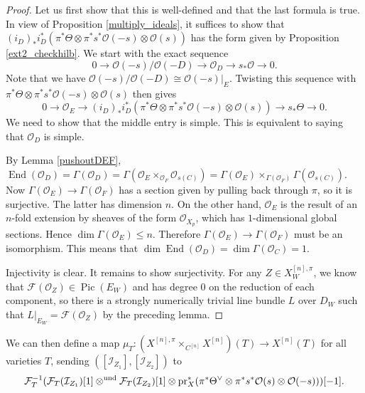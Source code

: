 \documentclass{amsart}
\theoremstyle{plain}
\theoremstyle{definition}
\theoremstyle{remark}
\begin{document}
    \begin{proof}
        Let us first show that this is well-defined and that the last formula is true.
        In view of Proposition \ref{multiply_ideals}, it suffices to show that $(i_D)_\ast i_D^\ast(\pi^\ast\Theta\otimes \pi^\ast s^{\ast}\mathcal O(-s)\otimes\mathcal O(s))$ has the form given by Proposition \ref{ext2_checkhilb}.
        We start with the exact sequence
        \[
        0\to \mathcal O(-s)/\mathcal O(-D)\to \mathcal O_D\to s_\ast\mathcal O\to 0.
        \]
        Note that we have $\mathcal O(-s)/\mathcal O(-D)\cong\mathcal O(-s)|_E$.
        Twisting this sequence with $\pi^\ast\Theta\otimes \pi^\ast s^{\ast}\mathcal O(-s)\otimes\mathcal O(s)$ then gives
        \[
        0\to \mathcal O_E\to (i_D)_\ast i_D^\ast(\pi^\ast\Theta\otimes \pi^\ast s^{\ast}\mathcal O(-s)\otimes\mathcal O(s)) \to s_\ast\Theta\to 0.
        \]
        We need to show that the middle entry is simple.
        This is equivalent to saying that $\mathcal O_D$ is simple.
        
        By Lemma \ref{pushoutDEF}, $\operatorname{End}(\mathcal O_D)=\Gamma(\mathcal O_D)=\Gamma(\mathcal O_E\times_{\mathcal O_F}\mathcal O_{s(C)})=\Gamma(\mathcal O_E)\times_{\Gamma(\mathcal O_F)}\Gamma(\mathcal O_{s(C)})$.
        Now $\Gamma(\mathcal O_E)\to\Gamma(\mathcal O_F)$ has a section given by pulling back through $\pi$, so it is surjective.
        The latter has dimension $n$.
        On the other hand, $\mathcal O_E$ is the result of an $n$-fold extension by sheaves of the form $\mathcal O_{X_p}$, which has $1$-dimensional global sections.
        Hence $\dim\Gamma(\mathcal O_E)\le n$.
        Therefore $\Gamma(\mathcal O_E)\to\Gamma(\mathcal O_F)$ must be an isomorphism.
        This means that $\dim\operatorname{End}(\mathcal O_D)=\dim\Gamma(\mathcal O_C)=1$.

        Injectivity is clear.
        It remains to show surjectivity.
        For any $Z\in X_W^{[n],\pi}$, we know that $\mathcal F(\mathcal O_Z)\in\operatorname{Pic}(E_W)$ and has degree $0$ on the reduction of each component, so there is a strongly numerically trivial line bundle $L$ over $D_W$ such that $L|_{E_W}=\mathcal F(\mathcal O_Z)$ by the preceding lemma.
    \end{proof}
    We can then define a map $\mu_T:(X^{[n],\pi}\times_{C^{[n]}}X^{[n]})(T)\to X^{[n]}(T)$ for all varieties $T$, sending $([\mathcal I_{Z_1}],[\mathcal I_{Z_2}])$ to
    \[\mathcal F_T^{-1}(\mathcal F_T(\mathcal I_{Z_1})[1]\otimes^{\rm und}\mathcal F_T(\mathcal I_{Z_2})[1]\otimes \operatorname{pr}_X^\ast (\pi^\ast\Theta^\vee\otimes \pi^\ast s^{\ast}\mathcal O(s)\otimes\mathcal O(-s)))[-1]. \]
\end{document}
